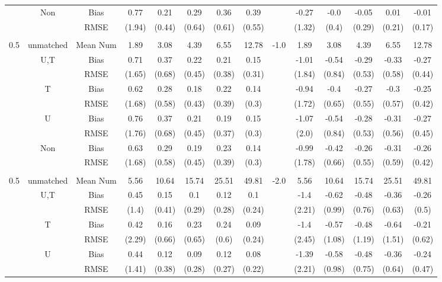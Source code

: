 \begin{tabular}{@{\extracolsep{5pt}}lc|cccccc|lccccc}
 & Non & Bias & 0.77 & 0.21 & 0.29 & 0.36 & 0.39 &  & -0.27 & -0.0 & -0.05 & 0.01 & -0.01 \\
 &  & RMSE & (1.94) & (0.44) & (0.64) & (0.61) & (0.55) &  & (1.32) & (0.4) & (0.29) & (0.21) & (0.17) \\
 &  &  &  &  &  &  &  &  &  &  &  &  &  \\
0.5 & unmatched & Mean Num & 1.89 & 3.08 & 4.39 & 6.55 & 12.78 & -1.0 & 1.89 & 3.08 & 4.39 & 6.55 & 12.78 \\
 & U,T & Bias & 0.71 & 0.37 & 0.22 & 0.21 & 0.15 &  & -1.01 & -0.54 & -0.29 & -0.33 & -0.27 \\
 &  & RMSE & (1.65) & (0.68) & (0.45) & (0.38) & (0.31) &  & (1.84) & (0.84) & (0.53) & (0.58) & (0.44) \\
 & T & Bias & 0.62 & 0.28 & 0.18 & 0.22 & 0.14 &  & -0.94 & -0.4 & -0.27 & -0.3 & -0.25 \\
 &  & RMSE & (1.68) & (0.58) & (0.43) & (0.39) & (0.3) &  & (1.72) & (0.65) & (0.55) & (0.57) & (0.42) \\
 & U & Bias & 0.76 & 0.37 & 0.21 & 0.19 & 0.15 &  & -1.07 & -0.54 & -0.28 & -0.31 & -0.27 \\
 &  & RMSE & (1.76) & (0.68) & (0.45) & (0.37) & (0.3) &  & (2.0) & (0.84) & (0.53) & (0.56) & (0.45) \\
 & Non & Bias & 0.63 & 0.29 & 0.19 & 0.23 & 0.14 &  & -0.99 & -0.42 & -0.26 & -0.31 & -0.26 \\
 &  & RMSE & (1.68) & (0.58) & (0.45) & (0.39) & (0.3) &  & (1.78) & (0.66) & (0.55) & (0.59) & (0.42) \\
 &  &  &  &  &  &  &  &  &  &  &  &  &  \\
0.5 & unmatched & Mean Num & 5.56 & 10.64 & 15.74 & 25.51 & 49.81 & -2.0 & 5.56 & 10.64 & 15.74 & 25.51 & 49.81 \\
 & U,T & Bias & 0.45 & 0.15 & 0.1 & 0.12 & 0.1 &  & -1.4 & -0.62 & -0.48 & -0.36 & -0.26 \\
 &  & RMSE & (1.4) & (0.41) & (0.29) & (0.28) & (0.24) &  & (2.21) & (0.99) & (0.76) & (0.63) & (0.5) \\
 & T & Bias & 0.42 & 0.16 & 0.23 & 0.24 & 0.09 &  & -1.4 & -0.57 & -0.48 & -0.64 & -0.21 \\
 &  & RMSE & (2.29) & (0.66) & (0.65) & (0.6) & (0.24) &  & (2.45) & (1.08) & (1.19) & (1.51) & (0.62) \\
 & U & Bias & 0.44 & 0.12 & 0.09 & 0.12 & 0.08 &  & -1.39 & -0.58 & -0.48 & -0.36 & -0.24 \\
 &  & RMSE & (1.41) & (0.38) & (0.28) & (0.27) & (0.22) &  & (2.21) & (0.98) & (0.75) & (0.64) & (0.47) \\

\end{tabular}
